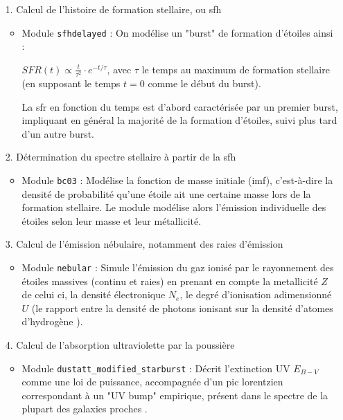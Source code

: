 \documentclass[12pt, a4paper]{article}
\begin{document}
\begin{itemize}
  \item[1.] Calcul de l'histoire de formation stellaire, ou \gls{sfh}
  \begin{itemize}
    \item Module \texttt{sfhdelayed} : On modélise un "burst" de formation d'étoiles ainsi :
    
     $SFR(t) \propto \frac{t}{\tau^2} \cdot e^{-t/\tau}$, avec $\tau$ le temps au maximum de formation stellaire (en supposant le temps $t=0$ comme le début du burst).

    La \gls{sfr} en fonction du temps est d'abord caractérisée par un premier burst, impliquant en général la majorité de la formation d'étoiles, suivi plus tard d'un autre burst.
  \end{itemize}

  \item[2.] Détermination du spectre stellaire à partir de la \gls{sfh}
  \begin{itemize}
    \item Module \texttt{bc03} : Modélise la fonction de masse initiale (\gls{imf}), c'est-à-dire la densité de probabilité qu'une étoile ait une certaine masse lors de la formation stellaire. Le module modélise alors l'émission individuelle des étoiles selon leur masse et leur métallicité.
  \end{itemize}

  \item[3.] Calcul de l'émission nébulaire, notamment des raies d'émission
  \begin{itemize}
    \item Module \texttt{nebular} : Simule l'émission du gaz ionisé par le rayonnement des étoiles massives (continu et raies) en prenant en compte la metallicité $Z$ de celui ci, la densité électronique $N_e$, le degré d'ionisation adimensionné $U$ (le rapport entre la densité de photons ionisant sur la densité d'atomes d'hydrogène \parencite{Astrophysics-of-the-Diffuse-Universe}).
  \end{itemize}

  \item[4.] Calcul de l'absorption ultraviolette par la poussière
  \begin{itemize}
    \item Module \texttt{dustatt\_modified\_starburst} : Décrit l'extinction UV $E_{B-V}$ comme une loi de puissance, accompagnée d'un pic lorentzien correspondant à un "UV bump" empirique, présent dans le spectre de la plupart des galaxies proches \parencite{10.1093/mnras/stac1313}.
  \end{itemize}


\end{itemize}
\end{document}
